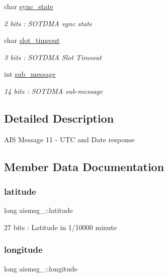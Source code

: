 \begin{DoxyCompactItemize}
char \mbox{\hyperlink{structaismsg__11_a3de802b402f0821a9a364daa7515a309}{sync\+\_\+state}}
\begin{DoxyCompactList}\small\item\em 2 bits \+: S\+O\+T\+D\+MA sync state \end{DoxyCompactList}\item 
char \mbox{\hyperlink{structaismsg__11_a8b791ab814507eee8cfa234ec7f80e5e}{slot\+\_\+timeout}}
\begin{DoxyCompactList}\small\item\em 3 bits \+: S\+O\+T\+D\+MA Slot Timeout \end{DoxyCompactList}\item 
int \mbox{\hyperlink{structaismsg__11_af40a5804ec7a5fbcdaededef861caa4e}{sub\+\_\+message}}
\begin{DoxyCompactList}\small\item\em 14 bits \+: S\+O\+T\+D\+MA sub-\/message \end{DoxyCompactList}\end{DoxyCompactItemize}


\subsection{Detailed Description}
A\+IS Message 11 -\/ U\+TC and Date response 

\subsection{Member Data Documentation}
\mbox{\label{structaismsg__11_a95446c6a1f69364c5506598ae66d7339}} 
\subsubsection{\texorpdfstring{latitude}{latitude}}
{\footnotesize\ttfamily long aismsg\+\_\+::latitude}



27 bits \+: Latitude in 1/10000 minute 

\mbox{\label{structaismsg__11_a5a503c16d031b3e8ddbfb169ba07e271}} 
\subsubsection{\texorpdfstring{longitude}{longitude}}
{\footnotesize\ttfamily long aismsg\+\_\+::longitude}



